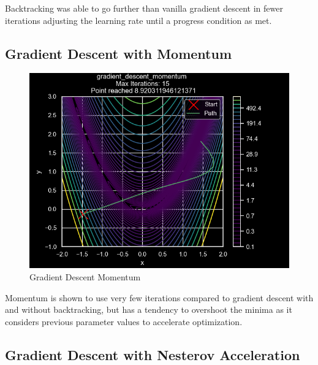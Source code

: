 \documentclass[
]{article}
\begin{document}
Backtracking was able to go further than vanilla gradient descent in fewer iterations adjusting the learning rate until a progress condition as met.

\subsection{Gradient Descent with Momentum}\label{gradient-descent-with-momentum}

\begin{figure}
\centering
\includegraphics{images/gradient_descent_momentum.png}
\caption{Gradient Descent Momentum}
\end{figure}

Momentum is shown to use very few iterations compared to gradient descent with and without backtracking, but has a tendency to overshoot the minima as it considers previous parameter values to accelerate optimization.

\subsection{Gradient Descent with Nesterov Acceleration}\label{gradient-descent-with-nesterov-acceleration}
\end{document}
